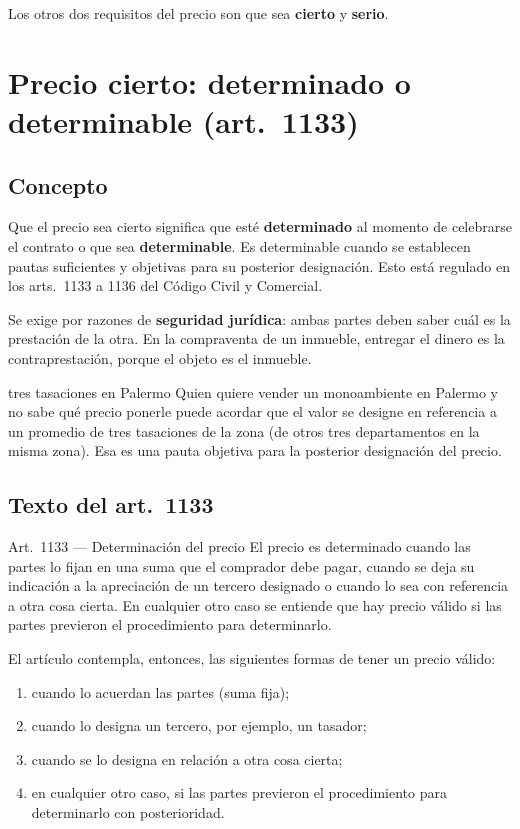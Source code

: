 \documentclass[12pt,oneside]{book}
\begin{document}
Los otros dos requisitos del precio son que sea \textbf{cierto} y \textbf{serio}.

\section{Precio cierto: determinado o determinable (art.~1133)}

\subsection{Concepto}

Que el precio sea cierto significa que est\'e \textbf{determinado} al momento de celebrarse el contrato o que sea \textbf{determinable}. Es determinable cuando se establecen pautas suficientes y objetivas para su posterior designaci\'on. Esto est\'a regulado en los arts.~1133 a 1136 del C\'odigo Civil y Comercial.

Se exige por razones de \textbf{seguridad jur\'idica}: ambas partes deben saber cu\'al es la prestaci\'on de la otra. En la compraventa de un inmueble, entregar el dinero es la contraprestaci\'on, porque el objeto es el inmueble.

\begin{example}{tres tasaciones en Palermo}
Quien quiere vender un monoambiente en Palermo y no sabe qu\'e precio ponerle puede acordar que el valor se designe en referencia a un promedio de tres tasaciones de la zona (de otros tres departamentos en la misma zona). Esa es una pauta objetiva para la posterior designaci\'on del precio.
\end{example}

\subsection{Texto del art.~1133}

\begin{norma}{Art.~1133 --- Determinaci\'on del precio}
El precio es determinado cuando las partes lo fijan en una suma que el comprador debe pagar, cuando se deja su indicaci\'on a la apreciaci\'on de un tercero designado o cuando lo sea con referencia a otra cosa cierta. En cualquier otro caso se entiende que hay precio v\'alido si las partes previeron el procedimiento para determinarlo.
\end{norma}

El art\'iculo contempla, entonces, las siguientes formas de tener un precio v\'alido:

\begin{enumerate}
    \item cuando lo acuerdan las partes (suma fija);
    \item cuando lo designa un tercero, por ejemplo, un tasador;
    \item cuando se lo designa en relaci\'on a otra cosa cierta;
    \item en cualquier otro caso, si las partes previeron el procedimiento para determinarlo con posterioridad.
\end{enumerate}
\end{document}
